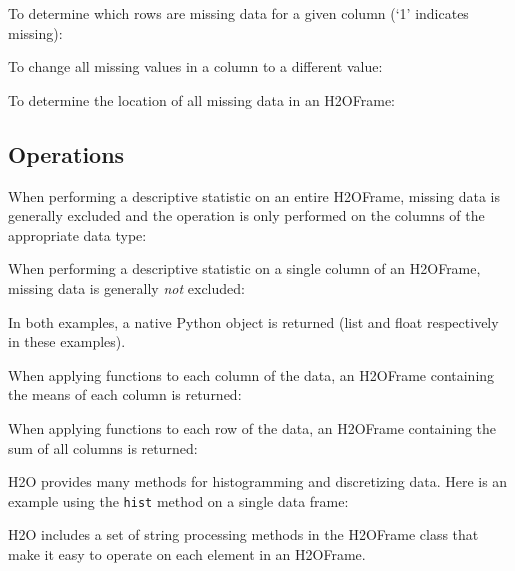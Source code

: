 {To determine which rows are missing data for a given column (`1' indicates missing):


To change all missing values in a column to a different value:


\newpage

To determine the location of all missing data in an H2OFrame:


\subsection{Operations}
When performing a descriptive statistic on an entire H2OFrame, missing data is generally excluded
and the operation is only performed on the columns of the appropriate data type:


When performing a descriptive statistic on a single column of an H2OFrame, missing data is generally 
\textit{not} excluded:


In both examples,  a native Python object is returned (list and float respectively
in these examples).

\newpage

When applying functions to each column of the data, an H2OFrame containing the means of each column is returned:


When applying functions to each row of the data, an H2OFrame containing the sum of all columns is returned:


H2O provides many methods for histogramming and discretizing data.
Here is an example using the {\texttt{hist}} method on a single data frame:


H2O includes a set of string processing methods in the H2OFrame class
that make it easy to operate on each element in an H2OFrame.  

}
